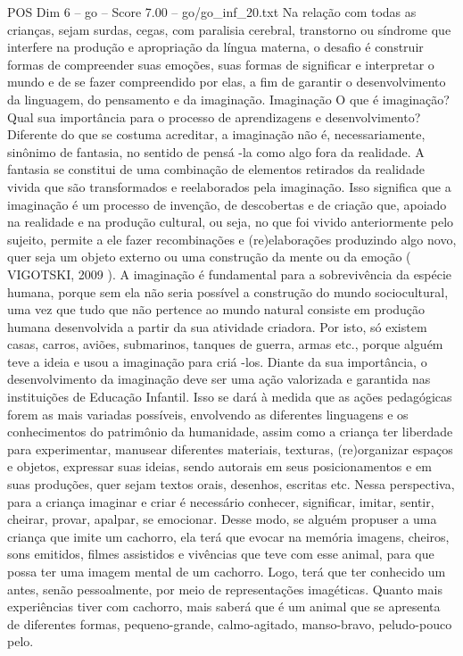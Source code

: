\begin{textsample}{POS Dim 6 – go – Score 7.00 – go/go\_inf\_20.txt}
Na relação com todas as crianças, sejam surdas, cegas, com paralisia cerebral, transtorno ou síndrome que interfere na produção e apropriação da língua materna, o desafio é construir formas de compreender suas emoções, suas formas de significar e interpretar o mundo e de se fazer compreendido por elas, a fim de garantir o desenvolvimento da linguagem, do pensamento e da imaginação.
Imaginação O que é imaginação?
Qual sua importância para o processo de aprendizagens e desenvolvimento?
Diferente do que se costuma acreditar, a imaginação não é, necessariamente, sinônimo de fantasia, no sentido de pensá -la como algo fora da realidade.
A fantasia se constitui de uma combinação de elementos retirados da realidade vivida que são transformados e reelaborados pela imaginação.
Isso significa que a imaginação é um processo de invenção, de descobertas e de criação que, apoiado na realidade e na produção cultural, ou seja, no que foi vivido anteriormente pelo sujeito, permite a ele fazer recombinações e (re)elaborações produzindo algo novo, quer seja um objeto externo ou uma construção da mente ou da emoção ( VIGOTSKI, 2009 ).
A imaginação é fundamental para a sobrevivência da espécie humana, porque sem ela não seria possível a construção do mundo sociocultural, uma vez que tudo que não pertence ao mundo natural consiste em produção humana desenvolvida a partir da sua atividade criadora.
Por isto, só existem casas, carros, aviões, submarinos, tanques de guerra, armas etc., porque alguém teve a ideia e usou a imaginação para criá -los.
Diante da sua importância, o desenvolvimento da imaginação deve ser uma ação valorizada e garantida nas instituições de Educação Infantil.
Isso se dará à medida que as ações pedagógicas forem as mais variadas possíveis, envolvendo as diferentes linguagens e os conhecimentos do patrimônio da humanidade, assim como a criança ter liberdade para experimentar, manusear diferentes materiais, texturas, (re)organizar espaços e objetos, expressar suas ideias, sendo autorais em seus posicionamentos e em suas produções, quer sejam textos orais, desenhos, escritas etc.
Nessa perspectiva, para a criança imaginar e criar é necessário conhecer, significar, imitar, sentir, cheirar, provar, apalpar, se emocionar.
Desse modo, se alguém propuser a uma criança que imite um cachorro, ela terá que evocar na memória imagens, cheiros, sons emitidos, filmes assistidos e vivências que teve com esse animal, para que possa ter uma imagem mental de um cachorro.
Logo, terá que ter conhecido um antes, senão pessoalmente, por meio de representações imagéticas.
Quanto mais experiências tiver com cachorro, mais saberá que é um animal que se apresenta de diferentes formas, pequeno-grande, calmo-agitado, manso-bravo, peludo-pouco pelo.

\end{textsample}
